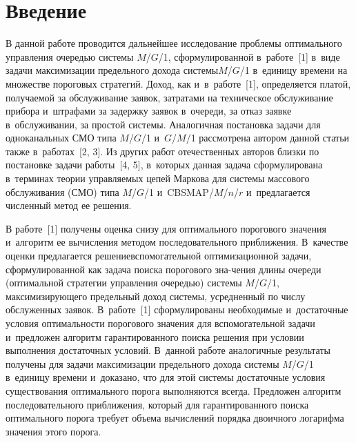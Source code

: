 \begin{multicols}{2}

\label{st\stat}

  
\section{Введение}

  В данной работе проводится дальнейшее ис\-следование проблемы 
оптимального управления очередью системы $M$/$G$/1, сформулированной 
в~рабо\-те~[1] в~виде задачи максимизации предельного дохо\-да 
системы$M$/$G$/1 в~единицу времени на множест\-ве пороговых стратегий. 
Доход, как и~в~работе~[1], определяется платой, получаемой за обслуживание 
заявок, затратами на техническое обслуживание прибора и~штрафами за 
задержку \mbox{заявок} в~очереди, за отказ заявке в~обслуживании, за прос\-той 
системы. Аналогичная постановка задачи для одноканальных СМО типа 
$M$/$G$/1 и~$G$/$M$/1 рас\-смот\-ре\-на автором данной статьи также 
в~работах~[2, 3]. Из других работ отечественных авторов близки по постановке 
задачи работы~[4, 5], в~которых данная задача сформулирована в~терминах 
теории управляемых цепей Маркова для сис\-те\-мы
массового обслуживания (СМО) типа $M$/$G$/1 
и~CBSMAP/$M$/$n$/$r$ и~предлагается численный метод ее решения. 
  
  В работе~[1] получены оценка снизу для оптимального 
  порогового значения и~алгоритм ее вы\-чис\-ле\-ния методом последовательного 
  приближения. 
В~качестве оценки предлагается решение\linebreak вспомогатель\-ной оптимизационной 
задачи, сформулированной как задача поиска порогового зна-\linebreak чения длины 
очереди (оптимальной стратегии управ\-ле\-ния очередью) системы $M$/$G$/1, 
максимизирующего предельный доход системы, усредненный по числу 
обслуженных заявок. В~работе~[1] сформулированы необходимые 
и~достаточные условия оптимальности порогового значения для 
вспомогательной задачи и~предложен алгоритм гарантированного поиска 
решения при условии выполнения достаточных условий. В~данной работе 
аналогичные результаты получены для задачи максимизации предельного 
дохода системы $M$/$G$/1 в~единицу времени и~доказано, что для этой 
системы достаточные условия существования оптимального порога 
выполняются всегда. Предложен алгоритм последовательного приближения, 
который для гарантированного поиска оптимального порога требует объема 
вычислений порядка двоичного логарифма значения этого порога. 


\end{multicols}
